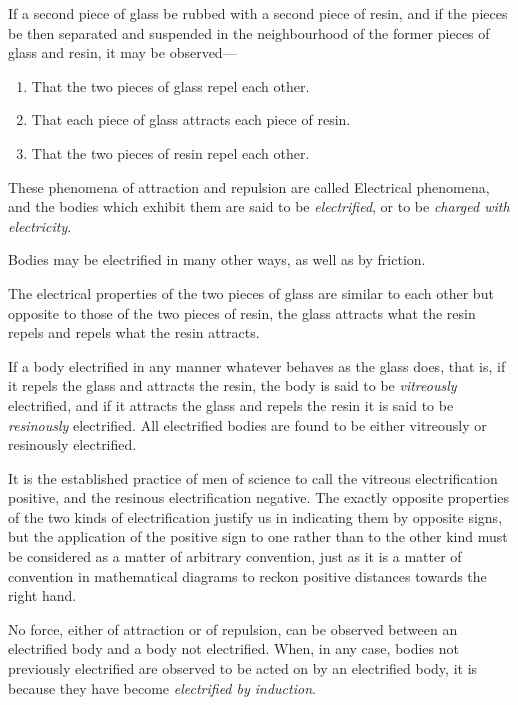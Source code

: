 \documentclass[11pt,a4paper]{article}
\begin{document}
If a second piece of glass be rubbed with a second piece of resin, and
if the pieces be then separated and suspended in the neighbourhood of
the former pieces of glass and resin, it may be observed---
\begin{enumerate}
\renewcommand{\labelenumi}{(\arabic{enumi})}
\item That the two pieces of glass repel each other.
\item That each piece of glass attracts each piece of resin.
\item That the two pieces of resin repel each other.
\end{enumerate}

These phenomena of attraction and repulsion are called Electrical
phenomena, and the bodies which exhibit them are said to be
\textit{electrified}, or to be \textit{charged with electricity}.

Bodies may be electrified in many other ways, as well as by friction.

The electrical properties of the two pieces of glass are similar to each
other but opposite to those of the two pieces of resin, the glass
attracts what the resin repels and repels what the resin attracts.

\clearpage
\setcounter{footnote}{0}

If a body electrified in any manner whatever behaves as the glass does,
that is, if it repels the glass and attracts the resin, the body is said
to be \textit{vitreously} electrified, and if it attracts the glass and
repels the resin it is said to be \textit{resinously} electrified. All
electrified bodies are found to be either vitreously or resinously
electrified.

It is the established practice of men of science to call the vitreous
electrification positive, and the resinous electrification negative.
The exactly opposite properties of the two kinds of electrification
justify us in indicating them by opposite signs, but the application of
the positive sign to one rather than to the other kind must be
considered as a matter of arbitrary convention, just as it is a matter
of convention in mathematical diagrams to reckon positive distances
towards the right hand.

No force, either of attraction or of repulsion, can be observed between
an electrified body and a body not electrified. When, in any case,
bodies not previously electrified are observed to be acted on by an
electrified body, it is because they have become \textit{electrified by
induction}.
\end{document}
